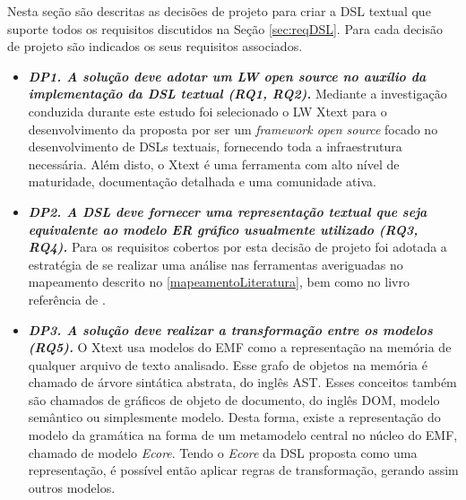 Nesta seção são descritas as decisões de projeto para criar a \ac{DSL} textual que suporte todos os requisitos discutidos na Seção \ref{sec:reqDSL}. 
Para cada decisão de projeto são indicados os seus requisitos associados.

\begin{itemize}
    \item\textit{\textbf{DP1. A solução deve adotar um \ac{LW} open source no auxílio da implementação da \ac{DSL} textual (RQ1, RQ2).}} 
    Mediante a investigação conduzida durante este estudo foi selecionado o \ac{LW} Xtext para o desenvolvimento da proposta por ser um \textit{framework open source} focado no desenvolvimento de \acp{DSL} textuais, fornecendo toda a infraestrutura necessária. 
    Além disto, o Xtext é uma ferramenta com alto nível de maturidade, documentação detalhada e uma comunidade ativa. 
    
    \item\textit{\textbf{DP2. A \ac{DSL} deve fornecer uma representação textual que seja equivalente ao modelo \ac{ER} gráfico usualmente utilizado (RQ3, RQ4).}} 
    Para os requisitos cobertos por esta decisão de projeto foi adotada a estratégia de se realizar uma análise nas ferramentas averiguadas no mapeamento descrito no \autoref{mapeamentoLiteratura}, bem como no livro referência de .
    
    \item\textit{\textbf{DP3. A solução deve realizar a transformação entre os modelos (RQ5).}} 
    O Xtext usa modelos do \ac{EMF} como a representação na memória de qualquer arquivo de texto analisado. 
    Esse grafo de objetos na memória é chamado de árvore sintática abstrata, do inglês \ac{AST}. 
    Esses conceitos também são chamados de gráficos de objeto de documento, do inglês \ac{DOM}, modelo semântico ou simplesmente modelo. 
    Desta forma, existe a representação do modelo da gramática na forma de um metamodelo central no núcleo do \ac{EMF}, chamado de modelo \textit{Ecore}. 
    Tendo o \textit{Ecore} da \ac{DSL} proposta como uma representação, é possível então aplicar regras de transformação, gerando assim outros modelos.
    
\end{itemize}


